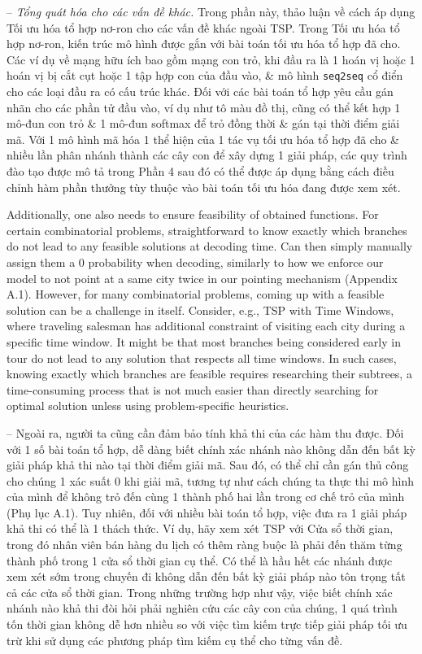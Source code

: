 \documentclass{article}
\begin{document}
\begin{itemize}
    -- {\it Tổng quát hóa cho các vấn đề khác.} Trong phần này, thảo luận về cách áp dụng Tối ưu hóa tổ hợp nơ-ron cho các vấn đề khác ngoài TSP. Trong Tối ưu hóa tổ hợp nơ-ron, kiến trúc mô hình được gắn với bài toán tối ưu hóa tổ hợp đã cho. Các ví dụ về mạng hữu ích bao gồm mạng con trỏ, khi đầu ra là 1 hoán vị hoặc 1 hoán vị bị cắt cụt hoặc 1 tập hợp con của đầu vào, \& mô hình {\tt seq2seq} cổ điển cho các loại đầu ra có cấu trúc khác. Đối với các bài toán tổ hợp yêu cầu gán nhãn cho các phần tử đầu vào, ví dụ như tô màu đồ thị, cũng có thể kết hợp 1 mô-đun con trỏ \& 1 mô-đun softmax để trỏ đồng thời \& gán tại thời điểm giải mã. Với 1 mô hình mã hóa 1 thể hiện của 1 tác vụ tối ưu hóa tổ hợp đã cho \& nhiều lần phân nhánh thành các cây con để xây dựng 1 giải pháp, các quy trình đào tạo được mô tả trong Phần 4 sau đó có thể được áp dụng bằng cách điều chỉnh hàm phần thưởng tùy thuộc vào bài toán tối ưu hóa đang được xem xét.
    
    Additionally, one also needs to ensure feasibility of obtained functions. For certain combinatorial problems, straightforward to know exactly which branches do not lead to any feasible solutions at decoding time. Can then simply manually assign them a 0 probability when decoding, similarly to how we enforce our model to not point at a same city twice in our pointing mechanism (Appendix A.1). However, for many combinatorial problems, coming up with a feasible solution can be a challenge in itself. Consider, e.g., TSP with Time Windows, where traveling salesman has additional constraint of visiting each city during a specific time window. It might be that most branches being considered early in tour do not lead to any solution that respects all time windows. In such cases, knowing exactly which branches are feasible requires researching their subtrees, a time-consuming process that is not much easier than directly searching for optimal solution unless using problem-specific heuristics.
    
    -- Ngoài ra, người ta cũng cần đảm bảo tính khả thi của các hàm thu được. Đối với 1 số bài toán tổ hợp, dễ dàng biết chính xác nhánh nào không dẫn đến bất kỳ giải pháp khả thi nào tại thời điểm giải mã. Sau đó, có thể chỉ cần gán thủ công cho chúng 1 xác suất 0 khi giải mã, tương tự như cách chúng ta thực thi mô hình của mình để không trỏ đến cùng 1 thành phố hai lần trong cơ chế trỏ của mình (Phụ lục A.1). Tuy nhiên, đối với nhiều bài toán tổ hợp, việc đưa ra 1 giải pháp khả thi có thể là 1 thách thức. Ví dụ, hãy xem xét TSP với Cửa sổ thời gian, trong đó nhân viên bán hàng du lịch có thêm ràng buộc là phải đến thăm từng thành phố trong 1 cửa sổ thời gian cụ thể. Có thể là hầu hết các nhánh được xem xét sớm trong chuyến đi không dẫn đến bất kỳ giải pháp nào tôn trọng tất cả các cửa sổ thời gian. Trong những trường hợp như vậy, việc biết chính xác nhánh nào khả thi đòi hỏi phải nghiên cứu các cây con của chúng, 1 quá trình tốn thời gian không dễ hơn nhiều so với việc tìm kiếm trực tiếp giải pháp tối ưu trừ khi sử dụng các phương pháp tìm kiếm cụ thể cho từng vấn đề.
    

\end{itemize}
\end{document}
